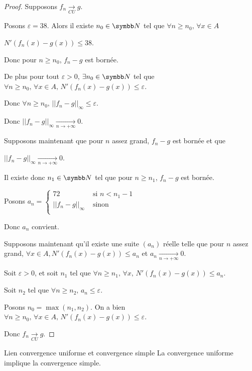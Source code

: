 \begin{proof}
    Supposons $f_n \xrightarrow[CU]{} g$.

    Posons $\varepsilon = 38$. Alors il existe $n_0 \in \N$ tel que $\forall n \geqslant n_0, \, \forall x \in A$ 
    
    $N'(f_n(x) - g(x)) \leqslant 38$.

    Donc pour $n \geqslant n_0$, $f_n - g$ est bornée.

    De plus pour tout $\varepsilon >0$, $\exists n_0 \in \N$ tel que $\forall n \geqslant n_0, \, \forall x \in A, \, N'(f_n(x) - g(x)) \leqslant \varepsilon$.

    Donc $\forall n \geqslant n_0, \, || f_n - g ||_{\infty} \leqslant \varepsilon$.

    Donc $\displaystyle || f_n - g ||_{\infty} \xrightarrow[n\to +\infty]{} 0$.

    \lvspace Supposons maintenant que pour $n$ assez grand, $f_n - g$ est bornée et que 
    
    $\displaystyle || f_n - g ||_{\infty} \xrightarrow[n\to +\infty]{} 0$.

    Il existe donc $n_1 \in \N$ tel que pour $n \geqslant n_1$, $f_n - g$ est bornée. 
    
    Posons 
    $a_n = \left\{ \begin{array}{cc}
        72 & \text{ si } n < n_1  - 1\\
        || f_n - g ||_{\infty} & \text{ sinon }\\
    \end{array} \right. $

    Donc $a_n$ convient. 

    \lvspace Supposons maintenant qu'il existe une suite $(a_n)$ réelle telle que pour $n$ assez grand, 
    $\forall x \in A, N'(f_n(x) - g(x)) \leqslant a_n$ et $a_n \xrightarrow[n\to +\infty]{} 0$.

    Soit $\varepsilon > 0$, et soit $n_1$ tel que $\forall n \geqslant n_1, \, \forall x, \, N'(f_n(x) - g(x)) \leqslant a_n$.

    Soit $n_2$ tel que $\forall n \geqslant n_2, \, a_n \leqslant \varepsilon$.

    Posons $n_0 = \max(n_1, n_2)$. On a bien $\forall n \geqslant n_0, \, \forall x \in A, \, N'(f_n(x) - g(x)) \leqslant \varepsilon$.

    Donc $f_n \xrightarrow[CU]{} g$.
\end{proof}

\begin{proposition}{Lien convergence uniforme et convergence simple}{}
    La convergence uniforme implique la convergence simple.
\end{proposition}

